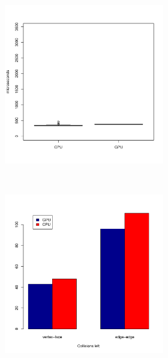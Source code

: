 	\begin{figure}
		\centering
		\begin{subfigure}[b]{0.45\textwidth}
			\begin{subfigure}[b]{0.45\textwidth}
				\includegraphics[width=\textwidth]{results/time/armadillo}
			\end{subfigure}
			~%
			\begin{subfigure}[b]{0.45\textwidth}
				\includegraphics[width=\textwidth]{results/correctness/armadillo}

\end{subfigure}
\end{subfigure}
\end{figure}
